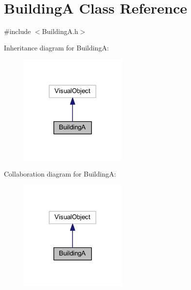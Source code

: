 \hypertarget{class_building_a}{}\section{BuildingA Class Reference}
\label{class_building_a}


{\ttfamily \#include $<$Building\+A.\+h$>$}



Inheritance diagram for BuildingA\+:\nopagebreak
\begin{figure}[H]
\begin{center}
\leavevmode
\includegraphics[width=152pt]{class_building_a__inherit__graph}
\end{center}
\end{figure}


Collaboration diagram for BuildingA\+:\nopagebreak
\begin{figure}[H]
\begin{center}
\leavevmode
\includegraphics[width=152pt]{class_building_a__coll__graph}
\end{center}
\end{figure}
